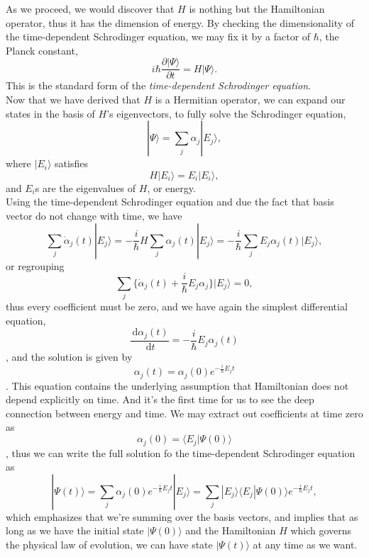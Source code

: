 \documentclass{article}
\newcommand{\be}{\begin{equation}}
\newcommand{\ee}{\end{equation}}
\newcommand{\dif}{\,\mathrm{d}}
\newcommand{\p}{\partial}
\newcommand{\1}{\left}
\newcommand{\2}{\right}
\newcommand{\la}{\langle}
\newcommand{\ra}{\rangle}
\newcommand{\al}{\alpha}
\begin{document}
As we proceed, we would discover that $H$ is nothing but the Hamiltonian operator, thus it has the dimension of energy. By checking the dimensionality of the time-dependent Schrodinger equation, we may fix it by a factor of $\hbar$, the Planck constant,
\be
i\hbar\frac{\p |\Psi\ra}{\p t}= H|\Psi\ra.
\ee
This is the standard form of the \textit{time-dependent Schrodinger equation}.\\

Now that we have derived that $H$ is a Hermitian operator, we can expand our states in the basis of $H$'s eigenvectors, to fully solve the Schrodinger equation,
\be
|\Psi\ra=\sum_j\al_j|E_j\ra,
\ee
where $|E_i\ra$ satisfies
\be
H|E_i\ra=E_i|E_i\ra,
\ee
and $E_i$s are the eigenvalues of $H$, or energy.\\
Using the time-dependent Schrodinger equation and due the fact that basis vector do not change with time, we have
\be
\sum_j\dot\al_j(t)|E_j\ra=-\frac i \hbar H\sum_j\al_j(t)|E_j\ra=-\frac i \hbar \sum_jE_j\al_j(t)|E_j\ra,
\ee
or regrouping
\be
\sum_j\bigg\{\dot\al_j(t)+\frac i \hbar E_j\al_j\bigg\}|E_j\ra=0,
\ee
thus every coefficient must be zero, and we have again the simplest differential equation,
\be\frac{\dif \al_j(t)}{\dif t}=-\frac i \hbar E_j \al_j(t)\ee,
and the solution is given by
\be\al_j(t)=\al_j(0)e^{-\frac i\hbar E_j t}\ee.
This equation contains the underlying assumption that Hamiltonian does not depend explicitly on time. And it's the first time for us to see the deep connection between energy and time.
We may extract out coefficients at time zero as \be\al_j(0)=\la E_j|\Psi(0)\ra\ee, thus we can write the full solution fo the time-dependent Schrodinger equation as
\be
|\Psi(t)\ra=\sum_j\al_j(0)e^{-\frac i\hbar E_jt}|E_j\ra=\sum_j|E_j\ra\la E_j|\Psi(0)\ra e^{-\frac i\hbar E_jt},
\ee
which emphasizes that we're summing over the basis vectors, and implies that as long as we have the initial state $|\Psi(0)\ra$ and the Hamiltonian $H$ which governs the physical law of evolution, we can have state $|\Psi(t)\ra$ at any time as we want.\\
\end{document}
